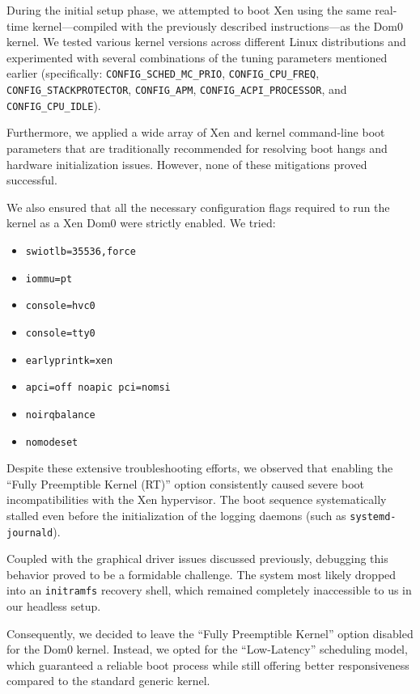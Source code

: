 During the initial setup phase, we attempted to boot Xen using the same
real-time kernel---compiled with the previously described
instructions---as the Dom0 kernel. We tested various kernel versions
across different Linux distributions and experimented with several
combinations of the tuning parameters mentioned earlier (specifically:
\texttt{CONFIG\_SCHED\_MC\_PRIO}, \texttt{CONFIG\_CPU\_FREQ},
\texttt{CONFIG\_STACKPROTECTOR}, \texttt{CONFIG\_APM},
\texttt{CONFIG\_ACPI\_PROCESSOR}, and \texttt{CONFIG\_CPU\_IDLE}).

Furthermore, we applied a wide array of Xen and kernel command-line boot
parameters that are traditionally recommended for resolving boot hangs
and hardware initialization issues. However, none of these mitigations
proved successful.

We also ensured that all the necessary configuration flags required to
run the kernel as a Xen Dom0 were strictly enabled. We tried:

\begin{itemize}
\item
  \texttt{swiotlb=35536,force}
\item
  \texttt{iommu=pt}
\item
  \texttt{console=hvc0}
\item
  \texttt{console=tty0}
\item
  \texttt{earlyprintk=xen}
\item
  \texttt{apci=off\ noapic\ pci=nomsi}
\item
  \texttt{noirqbalance}
\item
  \texttt{nomodeset}
\end{itemize}

Despite these extensive troubleshooting efforts, we observed that
enabling the ``Fully Preemptible Kernel (RT)'' option consistently
caused severe boot incompatibilities with the Xen hypervisor. The boot
sequence systematically stalled even before the initialization of the
logging daemons (such as \texttt{systemd-journald}).

Coupled with the graphical driver issues discussed previously, debugging
this behavior proved to be a formidable challenge. The system most
likely dropped into an \texttt{initramfs} recovery shell, which remained
completely inaccessible to us in our headless setup.

Consequently, we decided to leave the ``Fully Preemptible Kernel''
option disabled for the Dom0 kernel. Instead, we opted for the
``Low-Latency'' scheduling model, which guaranteed a reliable boot
process while still offering better responsiveness compared to the
standard generic kernel.

